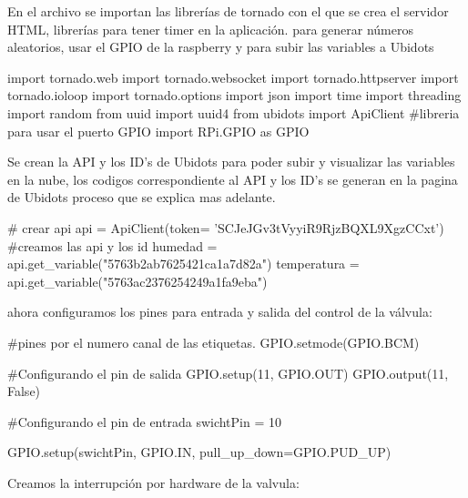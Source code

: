 \documentclass[10pt]{article}\usepackage[]{graphicx}\usepackage[]{color}
\begin{document}
En el archivo se importan las librerías de tornado con el que se crea el servidor HTML, librerías para tener timer en la aplicación. para generar números aleatorios, usar el GPIO de la raspberry y para subir las variables a Ubidots 

\begin{python}
import tornado.web
import tornado.websocket
import tornado.httpserver
import tornado.ioloop
import tornado.options
import json
import time
import threading
import random
from uuid import uuid4
from ubidots import ApiClient	
#libreria para usar el puerto GPIO
import RPi.GPIO as GPIO
\end{python}

Se crean la API y los ID's de Ubidots para poder subir y visualizar las variables en la nube, los  codigos correspondiente al API y los ID's se generan en la pagina de Ubidots proceso que se explica mas adelante. 
 
\begin{python}
# crear api 
api = ApiClient(token= 'SCJeJGv3tVyyiR9RjzBQXL9XgzCCxt')
#creamos las api y los id
humedad = api.get_variable("5763b2ab7625421ca1a7d82a")
temperatura = api.get_variable("5763ac2376254249a1fa9eba")
\end{python}

ahora configuramos los pines para entrada y salida del control de la válvula:
\begin{python}
#pines por el numero canal de las etiquetas.
GPIO.setmode(GPIO.BCM)

#Configurando el pin de salida
GPIO.setup(11, GPIO.OUT)
GPIO.output(11, False)

#Configurando el pin de entrada
swichtPin = 10

GPIO.setup(swichtPin, GPIO.IN, pull_up_down=GPIO.PUD_UP)
\end{python}

Creamos la interrupción por hardware de la valvula:
\end{document}
